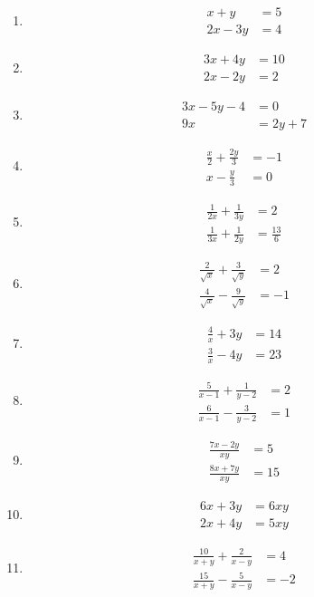 \begin{multicols}{2}
\begin{enumerate}[label=\thesubsection.\arabic*,ref=\thesubsection.\theenumi]
\item \begin{align*}x+y&=5\\2x-3y&=4\end{align*}
\item \begin{align*}3x+4y&=10\\ 2x-2y&=2\end{align*}
\item \begin{align*}3x-5y-4&=0\\9x&=2y+7\end{align*}
\item \begin{align*}\frac{x}{2}+\frac{2y}{3}&=-1\\x-\frac{y}{3}&=0\end{align*}
\item
\begin{align*}
\frac{1}{2x}+\frac{1}{3y}&=2 \\ \frac{1}{3x}+\frac{1}{2y}&=\frac{13}{6}
\end{align*}
\item
\begin{align*}
\frac{2}{\sqrt{x}}+\frac{3}{\sqrt{y}}&=2\\
\frac{4}{\sqrt{x}}-\frac{9}{\sqrt{y}}&=-1
\end{align*}
\item
\begin{align*}
\frac{4}{x}+3y&=14\\ \frac{3}{x}-4y&=23
\end{align*}
\item
\begin{align*}
\frac{5}{x-1}+\frac{1}{y-2}&=2\\ \frac{6}{x-1}-\frac{3}{y-2}&=1
\end{align*}
\item
\begin{align*}
\frac{7x-2y}{xy}&=5\\ \frac{8x+7y}{xy}&=15
\end{align*}
\item
\begin{align*}
6x+3y&=6xy\\ 2x+4y&=5xy
\end{align*}
\item
\begin{align*}
\frac{10}{x+y}+\frac{2}{x-y}&=4\\ \frac{15}{x+y}-\frac{5}{x-y}&=-2
\end{align*}

\end{enumerate}
\end{multicols}
